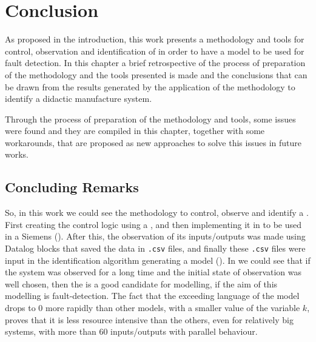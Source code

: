 \chapter{Conclusion}
\label{cha:conclusion}
As proposed in the introduction, this work presents a methodology and tools for
control, observation and identification of \DESs{} in order to have a model to be
used for fault detection. In this chapter a brief retrospective of the process
of preparation of the methodology and the tools presented is made and the
conclusions that can be drawn from the results generated by the application of
the methodology
to identify a didactic manufacture system.

Through the process of preparation of the methodology and tools, some issues
were found and they are compiled in this chapter, together with some
workarounds, that are proposed as new approaches to solve this issues in future works.

\section{Concluding Remarks}
\label{sec:concludingRemarks}
So, in this work we could see the methodology to control, observe and identify a
\DES{}. First creating the control logic using a \CIPN, and then implementing
it in \LD{} to be used in a Siemens \PLC{} (). After this, the observation of its
inputs\slash outputs was made using Datalog blocks that saved the data in
\verb|.csv| files, and finally these \verb|.csv| files were input in the
identification algorithm generating a \DAOCT{} model (). In
 we could see that if the system was observed for a long
time and the initial state of observation was well chosen, then the \DAOCT{} is
a good candidate for modelling, if the aim of this modelling is fault-detection.
The fact that the exceeding language of the \DAOCT{} model drops to $0$ more
rapidly than other models, with a smaller value of the variable $k$, proves that it is less resource intensive than the
others, even for relatively big
systems, with more than $60$ inputs\slash outputs with parallel behaviour.


